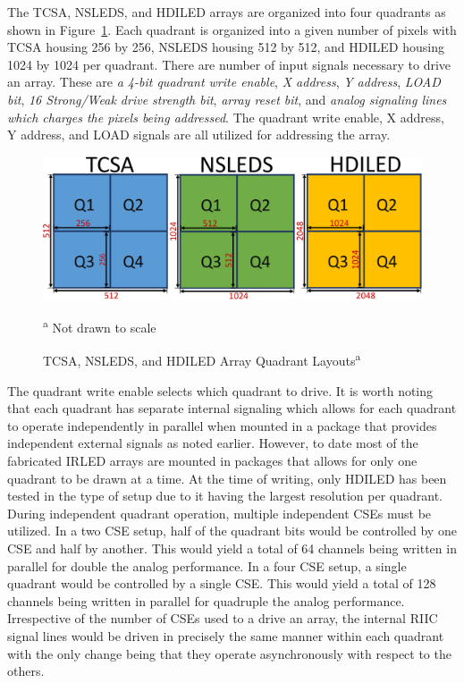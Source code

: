     The TCSA, NSLEDS, and HDILED arrays are organized into four quadrants as shown in Figure~\ref{fig:tcsa_nsleds_hdiled_quads}. Each quadrant is organized into a given number of pixels with TCSA housing 256 by 256, NSLEDS housing 512 by 512, and HDILED housing 1024 by 1024 per quadrant. There are number of input signals necessary to drive an array. These are {\em a 4-bit quadrant write enable}, {\em X address}, {\em Y address}, {\em LOAD bit}, {\em 16 Strong/Weak drive strength bit}, {\em array reset bit}, and {\em analog signaling lines which charges the pixels being addressed}. The quadrant write enable, X address, Y address, and LOAD signals are all utilized for addressing the array.

    \begin{figure}
        \centering
        \includegraphics[width=1.0\textwidth]{fig/tcsa_nsleds_hdiled_quads.pdf}
        \caption[TCSA, NSLEDS, and HDILED Array Quadrant Layouts]{TCSA, NSLEDS, and HDILED Array Quadrant Layouts\textsuperscript{a}}
        \vspace{0px}
        \footnotesize\textsuperscript{a} Not drawn to scale
        \label{fig:tcsa_nsleds_hdiled_quads}
    \end{figure}

    The quadrant write enable selects which quadrant to drive. It is worth noting that each quadrant has separate internal signaling which allows for each quadrant to operate independently in parallel when mounted in a package that provides independent external signals as noted earlier. However, to date most of the fabricated IRLED arrays are mounted in packages that allows for only one quadrant to be drawn at a time. At the time of writing, only HDILED has been tested in the type of setup\cite{LassiterEtAl2019_0, LassiterEtAl2019_1, LassiterEtAl2019_2, LassiterEtAl2020} due to it having the largest resolution per quadrant. During independent quadrant operation, multiple independent CSEs must be utilized. In a two CSE setup, half of the quadrant bits would be controlled by one CSE and half by another. This would yield a total of 64 channels being written in parallel for double the analog performance. In a four CSE setup, a single quadrant would be controlled by a single CSE. This would yield a total of 128 channels being written in parallel for quadruple the analog performance. Irrespective of the number of CSEs used to a drive an array, the internal RIIC signal lines would be driven in precisely the same manner within each quadrant with the only change being that they operate asynchronously with respect to the others.


